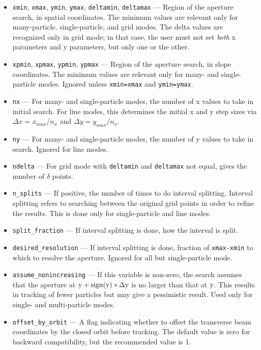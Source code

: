 \documentclass[11pt]{article}
\begin{document}
\begin{itemize}
\item \verb|xmin|, \verb|xmax|, \verb|ymin|, \verb|ymax|, \verb|deltamin|, \verb|deltamax|  ---
  Region of the aperture search, in spatial coordinates. The minimum values are relevant only for many-particle. single-particle,
  and grid modes. 
  The delta values are recognized only in grid mode; in that case, the user must not set {\em both} x parameters and y parameters,
  but only one or the other.

\item \verb|xpmin|, \verb|xpmax|, \verb|ypmin|, \verb|ypmax| ---
  Region of the aperture search, in slope coordinates. The minimum values are relevant only for many- and single-particle modes.
  Ignored unless \verb|xmin=xmax| and \verb|ymin=ymax|.

\item \verb|nx| --- For many- and single-particle modes, the number of x values to take in initial search.
  For line modes, this determines the initial x and y step sizes via $\Delta x = x_{max}/n_x$ and
  $\Delta y = y_{max}/n_x$.
\item \verb|ny| --- For many- and single-particle modes, the number of y values to take in search.
  Ignored for line modes.
\item \verb|ndelta| --- For grid mode with \verb|deltamin| and \verb|deltamax| not equal, gives the number of $\delta$ points.

\item \verb|n_splits| --- If positive, the number of times to do
interval splitting.  Interval splitting refers to searching between
the original grid points in order to refine the results.  This is done
only for single-particle and line modes.

\item \verb|split_fraction| --- If interval splitting is done, how the interval is split.

\item \verb|desired_resolution| --- If interval splitting is done,
fraction of \verb|xmax-xmin| to which to resolve the aperture.  Ignored for all but single-particle
mode.

\item \verb|assume_nonincreasing| --- If this variable is non-zero, the search assumes that the aperture
at ${\rm y+sign(y)*\Delta y}$ is no larger than that at ${\rm y}$.  This results in tracking of
fewer particles but may give a pessimistic result.    Used only for single- and multi-particle
modes.

\item \verb|offset_by_orbit| --- A flag indicating whether to offset
the transverse beam coordinates by the closed orbit before tracking.  The default value is
zero for backward compatibility, but the recommended value is 1.


\end{itemize}
\end{document}

